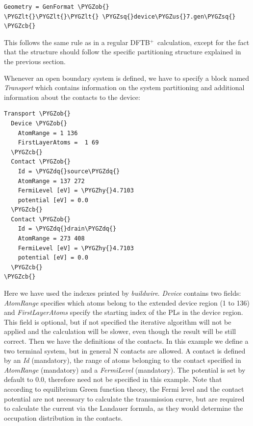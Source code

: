 \documentclass[a4paper,11pt,english]{sphinxmanual}
\newcommand{\dftbp}{\textsf{DFTB$^{\text{+}}$\ }} %
\def\PYGZus{\char`\_}
\def\PYGZob{\char`\{}
\def\PYGZcb{\char`\}}
\def\PYGZlt{\char`\<}
\def\PYGZhy{\char`\-}
\def\PYGZsq{\char`\'}
\def\PYGZdq{\char`\"}
\renewcommand\PYGZsq{\textquotesingle}
\begin{document}
{{\begin{Verbatim}[commandchars=\\\{\}]
Geometry = GenFormat \PYGZob{}
\PYGZlt{}\PYGZlt{}\PYGZlt{} \PYGZsq{}device\PYGZus{}7.gen\PYGZsq{}
\PYGZcb{}
\end{Verbatim}

This follows the same rule as in a regular \dftbp calculation, except
for the fact that the structure should follow the specific
partitioning structure explained in the previous section.

Whenever an open boundary system is defined, we have to specify a
block named \emph{Transport} which contains information on the system
partitioning and additional information about the contacts to the
device:

\begin{Verbatim}[commandchars=\\\{\}]
Transport \PYGZob{}
  Device \PYGZob{}
    AtomRange = 1 136
    FirstLayerAtoms =  1 69
  \PYGZcb{}
  Contact \PYGZob{}
    Id = \PYGZdq{}source\PYGZdq{}
    AtomRange = 137 272
    FermiLevel [eV] = \PYGZhy{}4.7103
    potential [eV] = 0.0
  \PYGZcb{}
  Contact \PYGZob{}
    Id = \PYGZdq{}drain\PYGZdq{}
    AtomRange = 273 408
    FermiLevel [eV] = \PYGZhy{}4.7103
    potential [eV] = 0.0
  \PYGZcb{}
\PYGZcb{}
\end{Verbatim}

Here we have used the indexes printed by \emph{buildwire}. \emph{Device}
contains two fields: \emph{AtomRange} specifies which atoms belong to the
extended device region (1 to 136) and \emph{FirstLayerAtoms} specify the
starting index of the PLs in the device region. This field is
optional, but if not specified the iterative algorithm will not be
applied and the calculation will be slower, even though the result
will be still correct.  Then we have the definitions of the
contacts. In this example we define a two terminal system, but in
general N contacts are allowed. A contact is defined by an \emph{Id}
(mandatory), the range of atoms belonging to the contact specified in
\emph{AtomRange} (mandatory) and a \emph{FermiLevel} (mandatory). The potential
is set by default to 0.0, therefore need not be specified in this
example. Note that according to equilibrium Green function theory,
the Fermi level and the contact potential are not necessary to
calculate the transmission curve, but are required to calculate the
current via the Landauer formula, as they would determine the
occupation distribution in the contacts.

}}
\end{document}

